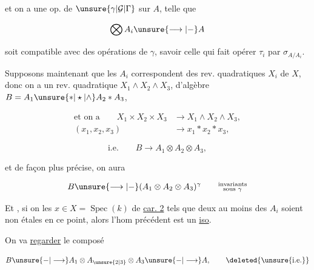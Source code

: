 
et  on a une  op. de $\unsure{\gamma|\mathcal G|\Gamma}$ sur $A$, telle que

\[
 \bigotimes A_i\unsure{\longrightarrow|\mathord{-}}A
\]

soit compatible avec des opérations de $\gamma$, savoir celle qui fait opérer \uline{$\tau_i$} par $\sigma_{A/A_i}$.

 Supposons maintenant que les $A_i$ correspondent  des rev. quadratiques $X_i$ de $X$, donc on a un rev. quadratique $X_1\wedge X_2\wedge X_3$, d'algèbre $B=A_1\unsure{*|\star|\wedge}A_2*A_3$,

\[
 \begin{aligned}
 \text{et on a}\qquad X_1\times X_2\times X_3&\longrightarrow X_1\wedge X_2\wedge X_3,\\
 (x_1,x_2,x_3)&\longrightarrow x_1*x_2*x_3,
 \end{aligned}
\]

\[
 \text{i.e.}\qquad B\longrightarrow A_1\otimes A_2\otimes A_3,
\]

et de façon plus précise, on aura

\[
 B\unsure{\longrightarrow|\mathord{-}}(A_1\otimes A_2\otimes A_3)^\gamma
 \qquad\substack{\text{invariants}\\\text{sous }\gamma}
\]

Et , si on  les $x\in X=\operatorname{Spec}(k)$ de \uline{car. 2} tels que deux au moins des $A_i$ soient non étales en ce point, alors l'hom précédent est un \uline{iso}.

On va \uline{regarder} le composé

\[
 B\unsure{\mathord{-}|\longrightarrow}A_1\otimes A_{\unsure{2|3}}\otimes A_3\unsure{\mathord{-}|\longrightarrow}A,\qquad\deleted{\unsure{\text{i.e.}}}
\]

